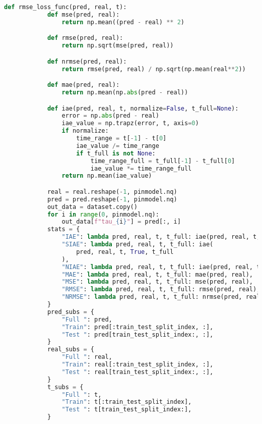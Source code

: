 \begin{lstlisting}[language=python, caption=\raggedright{identification/full.py}, frame=single]
        def rmse_loss_func(pred, real, t):
            def mse(pred, real):
                return np.mean((pred - real) ** 2)

            def rmse(pred, real):
                return np.sqrt(mse(pred, real))

            def nrmse(pred, real):
                return rmse(pred, real) / np.sqrt(np.mean(real**2))

            def mae(pred, real):
                return np.mean(np.abs(pred - real))

            def iae(pred, real, t, normalize=False, t_full=None):
                error = np.abs(pred - real)
                iae_value = np.trapz(error, t, axis=0)
                if normalize:
                    time_range = t[-1] - t[0]
                    iae_value /= time_range
                    if t_full is not None:
                        time_range_full = t_full[-1] - t_full[0]
                        iae_value *= time_range_full
                return np.mean(iae_value)

            real = real.reshape(-1, pinmodel.nq)
            pred = pred.reshape(-1, pinmodel.nq)
            out_data = dataset.copy()
            for i in range(0, pinmodel.nq):
                out_data[f"tau_{i}"] = pred[:, i]
            stats = {
                "IAE": lambda pred, real, t, t_full: iae(pred, real, t, False),
                "SIAE": lambda pred, real, t, t_full: iae(
                    pred, real, t, True, t_full
                ),
                "NIAE": lambda pred, real, t, t_full: iae(pred, real, t, True),
                "MAE": lambda pred, real, t, t_full: mae(pred, real),
                "MSE": lambda pred, real, t, t_full: mse(pred, real),
                "RMSE": lambda pred, real, t, t_full: rmse(pred, real),
                "NRMSE": lambda pred, real, t, t_full: nrmse(pred, real),
            }
            pred_subs = {
                "Full ": pred,
                "Train": pred[:train_test_split_index, :],
                "Test ": pred[train_test_split_index:, :],
            }
            real_subs = {
                "Full ": real,
                "Train": real[:train_test_split_index, :],
                "Test ": real[train_test_split_index:, :],
            }
            t_subs = {
                "Full ": t,
                "Train": t[:train_test_split_index],
                "Test ": t[train_test_split_index:],
            }


\end{lstlisting}
